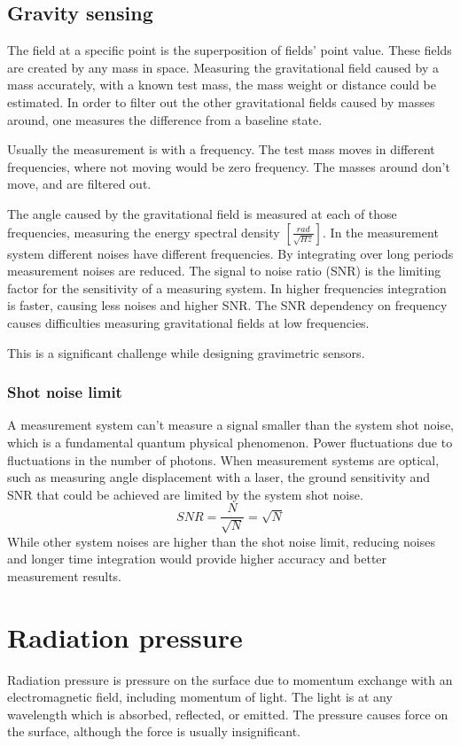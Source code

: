 \documentclass[\main/master.tex]{subfiles}
\begin{document}
\subsection{Gravity sensing}
The field at a specific point is the superposition of fields' point value. These fields are created by any mass in space. Measuring the gravitational field caused by a mass accurately, with a known test mass, the mass weight or distance could be estimated. In order to filter out the other gravitational fields caused by masses around, one measures the difference from a baseline state.
\par\noindent
Usually the measurement is with a frequency. The test mass moves in different frequencies, where not moving would be zero frequency. The masses around don't move, and are filtered out.
\par\noindent
The angle caused by the gravitational field is measured at each of those frequencies, measuring the energy spectral density $[\frac{rad}{\sqrt{Hz}}]$.
In the measurement system different noises have different frequencies. By integrating over long periods measurement noises are reduced. The signal to noise ratio (SNR) is the limiting factor for the sensitivity of a measuring system. In higher frequencies integration is faster, causing less noises and higher SNR.
The SNR dependency on frequency causes difficulties measuring gravitational fields at low frequencies.
\par\noindent
This is a significant challenge while designing gravimetric sensors.

\subsubsection{Shot noise limit}
A measurement system can't measure a signal smaller than the system shot noise, which is a fundamental quantum physical phenomenon. Power fluctuations due to fluctuations in the number of photons. When measurement systems are optical, such as measuring angle displacement with a laser, the ground sensitivity and SNR that could be achieved are limited by the system shot noise.   
\begin{equation}
SNR = \frac{N}{\sqrt{N}} = \sqrt{N}    \label{eqn:shot_noise}
\end{equation}
While other system noises are higher than the shot noise limit, reducing noises and longer time integration would provide higher accuracy and better measurement results. 

\section{Radiation pressure}
Radiation pressure is pressure on the surface due to momentum exchange with an electromagnetic field, including momentum of light. The light is at any wavelength which is absorbed, reflected, or emitted. The pressure causes force on the surface, although the force is usually insignificant.
  
\end{document}
